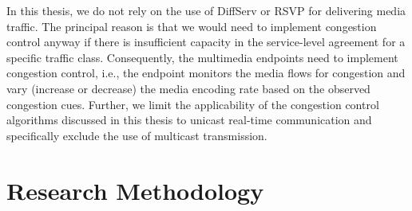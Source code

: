 





In this thesis, we do not rely on the use of DiffServ or RSVP for delivering
media traffic. The principal reason is that we would need to implement
congestion control anyway if there is insufficient capacity in the 
service-level agreement for a specific traffic class. Consequently, the multimedia
endpoints need to implement congestion control, i.e., the endpoint monitors
the media flows for congestion and vary (increase or decrease) the media
encoding rate based on the observed congestion cues. Further, we limit the
applicability of the congestion control algorithms discussed in this thesis to
unicast real-time communication and specifically exclude the use of multicast
transmission. 



\section{Research Methodology}

